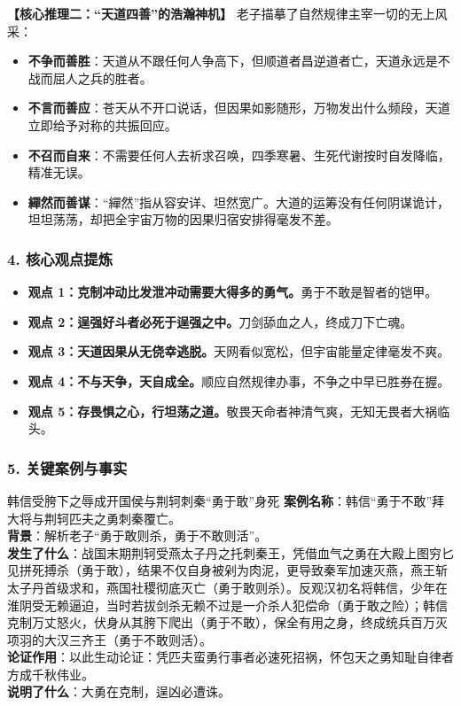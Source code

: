 \noindent\textbf{【核心推理二：“天道四善”的浩瀚神机】}
老子描摹了自然规律主宰一切的无上风采：
\begin{itemize}
    \item \textbf{不争而善胜}：天道从不跟任何人争高下，但顺道者昌逆道者亡，天道永远是不战而屈人之兵的胜者。
    \item \textbf{不言而善应}：苍天从不开口说话，但因果如影随形，万物发出什么频段，天道立即给予对称的共振回应。
    \item \textbf{不召而自来}：不需要任何人去祈求召唤，四季寒暑、生死代谢按时自发降临，精准无误。
    \item \textbf{繟然而善谋}：“繟然”指从容安详、坦然宽广。大道的运筹没有任何阴谋诡计，坦坦荡荡，却把全宇宙万物的因果归宿安排得毫发不差。
\end{itemize}

\subsubsection{4. 核心观点提炼}
\begin{itemize}
    \item \textbf{观点 1：克制冲动比发泄冲动需要大得多的勇气。}勇于不敢是智者的铠甲。
    \item \textbf{观点 2：逞强好斗者必死于逞强之中。}刀剑舔血之人，终成刀下亡魂。
    \item \textbf{观点 3：天道因果从无侥幸逃脱。}天网看似宽松，但宇宙能量定律毫发不爽。
    \item \textbf{观点 4：不与天争，天自成全。}顺应自然规律办事，不争之中早已胜券在握。
    \item \textbf{观点 5：存畏惧之心，行坦荡之道。}敬畏天命者神清气爽，无知无畏者大祸临头。
\end{itemize}

\subsubsection{5. 关键案例与事实}
\begin{CaseBox}{韩信受胯下之辱成开国侯与荆轲刺秦“勇于敢”身死}
\textbf{案例名称}：韩信“勇于不敢”拜大将与荆轲匹夫之勇刺秦覆亡。\\
\textbf{背景}：解析老子“勇于敢则杀，勇于不敢则活”。\\
\textbf{发生了什么}：战国末期荆轲受燕太子丹之托刺秦王，凭借血气之勇在大殿上图穷匕见拼死搏杀（勇于敢），结果不仅自身被剁为肉泥，更导致秦军加速灭燕，燕王斩太子丹首级求和，燕国社稷彻底灭亡（勇于敢则杀）。反观汉初名将韩信，少年在淮阴受无赖逼迫，当时若拔剑杀无赖不过是一介杀人犯偿命（勇于敢之险）；韩信克制万丈怒火，伏身从其胯下爬出（勇于不敢），保全有用之身，终成统兵百万灭项羽的大汉三齐王（勇于不敢则活）。\\
\textbf{论证作用}：以此生动论证：凭匹夫蛮勇行事者必速死招祸，怀包天之勇知耻自律者方成千秋伟业。\\
\textbf{说明了什么}：大勇在克制，逞凶必遭诛。
\end{CaseBox}

